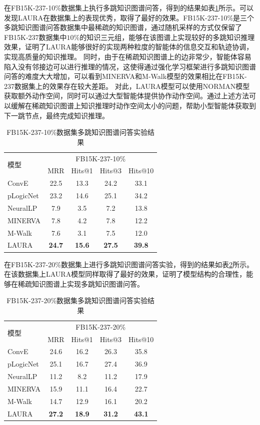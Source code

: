 \documentclass[algorithmlist, AutoFakeBold, AutoFakeSlant, figurelist, tablelist, nomlist, engineering]{seuthesix}
\begin{document}
在FB15K-237-10\%数据集上执行多跳知识图谱问答，得到的结果如表\ref{Experiment2_FB15K-237-10}所示。可以发现LAURA在数据集上的表现优秀，取得了最好的效果。FB15K-237-10\%是三个多跳知识图谱问答数据集中最稀疏的知识图谱，通过随机采样的方式仅保留了FB15K-237数据集中$10\%$的知识三元组，能够在该图谱上实现较好的多跳知识推理效果，证明了LAURA能够很好的实现两种粒度的智能体的信息交互和轨迹协调，实现高质量的知识推理。
同时，由于在稀疏知识图谱上的边非常少，智能体容易陷入没有邻接边可以进行推理的情况，这使得通过强化学习框架进行多跳知识图谱问答的难度大大增加，可以看到MINERVA和M-Walk模型的效果相比在FB15K-237数据集上的效果存在较大差距。
对此，LAURA模型可以使用NORMAN模型获取额外动作空间，同时可以通过大型智能体提供协作动作空间。通过上述方法可以缓解在稀疏知识图谱上知识推理时动作空间太小的问题，帮助小型智能体获取到下一跳节点，最终完成知识推理。
\begin{table}[t]
  \centering
  \caption{FB15K-237-10\%数据集多跳知识图谱问答实验结果}
  \begin{tabular*}{0.95\textwidth}{@{\extracolsep{\fill}}lcccc}
    \toprule[1pt]
    \multirow{2}{*}{模型} & \multicolumn{4}{c}{FB15K-237-10\%}   \\
      & MRR & Hits@1 & Hits@3 & Hits@10 \\ \hline
    ConvE & 22.5 & 13.3 & 24.2 & 33.1 \\
    pLogicNet & 23.2 & 14.6 & 25.1 & 34.2 \\
    NeuralLP & 7.9 & 3.5 & 7.2 & 13.8 \\
    MINERVA & 7.8 & 4.2 & 7.8 & 12.2 \\
    M-Walk & 7.6 & 3.1 & 7.5 & 12.0 \\
    LAURA & \textbf{24.7} & \textbf{15.6} & \textbf{27.5} & \textbf{39.8} \\
    \bottomrule[1pt]
  \end{tabular*}
  \label{Experiment2_FB15K-237-10}
\end{table}

在FB15K-237-20\%数据集上进行多跳知识图谱问答实验，得到的结果如表\ref{Experiment2_FB15K-237-20}所示。在该数据集上LAURA模型同样取得了最好的效果，证明了模型结构的合理性，能够在稀疏知识图谱上实现多跳知识图谱问答。
\begin{table}[t]
  \centering
  \caption{FB15K-237-20\%数据集多跳知识图谱问答实验结果}
  \begin{tabular*}{0.95\textwidth}{@{\extracolsep{\fill}}lcccc}
    \toprule[1pt]
    \multirow{2}{*}{模型} & \multicolumn{4}{c}{FB15K-237-20\%}   \\
      & MRR & Hits@1 & Hits@3 & Hits@10 \\ \hline
    ConvE & 24.6 & 16.2 & 26.3 & 35.8 \\
    pLogicNet & 25.1 & 16.7 & 27.4 & 36.9 \\
    NeuralLP & 11.2 & 8.2 & 11.2 & 17.9 \\
    MINERVA & 15.9 & 11.1 & 16.4 & 22.7 \\
    M-Walk & 14.7 & 12.9 & 16.1 & 20.2 \\
    LAURA & \textbf{27.2} & \textbf{18.9} & \textbf{31.2} & \textbf{43.1} \\
    \bottomrule[1pt]
  \end{tabular*}
  \label{Experiment2_FB15K-237-20}
\end{table}
\end{document}
